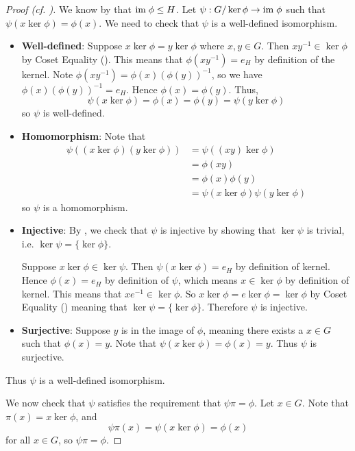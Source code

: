 \begin{proof}[Proof (cf. {\cite[p.~250, Theorem 2]{cohn_1982}})]
    We know by  that $\mathrm{im}\;\phi \leq H$. Let $\psi: G/\ker\phi \to \mathrm{im}\;\phi$ such that $\psi(x\ker\phi) = \phi(x)$. We need to check that $\psi$ is a well-defined isomorphism.
    \begin{itemize}
        \item \textbf{Well-defined}: Suppose $x\ker\phi = y\ker\phi$ where $x, y \in G$. Then $xy^{-1} \in \ker\phi$ by Coset Equality (). This means that $\phi(xy^{-1}) = e_H$ by definition of the kernel. Note $\phi(xy^{-1}) = \phi(x)\left(\phi(y)\right)^{-1}$, so we have $\phi(x)\left(\phi(y)\right)^{-1} = e_H$. Hence $\phi(x) = \phi(y)$. Thus,
        \[
            \psi(x\ker\phi) = \phi(x) = \phi(y) = \psi(y\ker\phi)
        \]
        so $\psi$ is well-defined.

        \item \textbf{Homomorphism}: Note that
        \begin{align*}
            \psi((x\ker\phi)(y\ker\phi)) &= \psi((xy)\ker\phi)\\
            &= \phi(xy)\\
            &= \phi(x)\phi(y)\\
            &= \psi(x\ker\phi)\psi(y\ker\phi)
        \end{align*}
        so $\psi$ is a homomorphism.
        \item \textbf{Injective}: By , we check that $\psi$ is injective by showing that $\ker\psi$ is trivial, i.e. $\ker\psi = \{\ker\phi\}$.

        Suppose $x\ker\phi\in\ker\psi$. Then $\psi(x\ker\phi) = e_H$ by definition of kernel. Hence $\phi(x) = e_H$ by definition of $\psi$, which means $x \in \ker\phi$ by definition of kernel. This means that $xe^{-1} \in \ker\phi$. So $x\ker\phi = e\ker\phi = \ker\phi$ by Coset Equality () meaning that $\ker\psi = \{\ker\phi\}$. Therefore $\psi$ is injective.

        \item \textbf{Surjective}: Suppose $y$ is in the image of $\phi$, meaning there exists a $x \in G$ such that $\phi(x) = y$. Note that $\psi(x\ker\phi) = \phi(x) = y$. Thus $\psi$ is surjective.
    \end{itemize}
    Thus $\psi$ is a well-defined isomorphism.

    We now check that $\psi$ satisfies the requirement that $\psi\pi = \phi$. Let $x \in G$. Note that $\pi(x) = x\ker\phi$, and
    \[
        \psi\pi(x) = \psi(x\ker\phi) = \phi(x)
    \]
    for all $x \in G$, so $\psi\pi = \phi$.


\end{proof}
